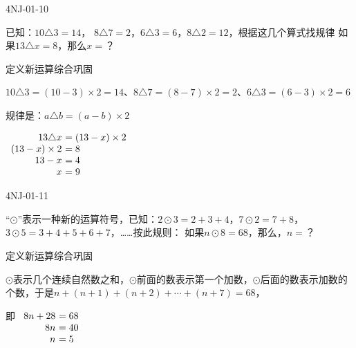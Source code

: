 \begin{defproblem}{4NJ-01-10}%
\begin{onlyproblem}%
已知：$10\triangle 3=14$， $8\triangle 7=2$，$6\triangle 3=6$，$8\triangle 2=12$，根据这几个算式找规律
如果$13\triangle x=8$，那么$x=$？



\end{onlyproblem}%
\begin{onlysolution}%
定义新运算综合巩固

$10\triangle 3=(10-3)\times 2=14$、$8\triangle 7=(8-7)\times 2=2$、$6\triangle 3=(6-3)\times 2=6$

规律是：$a\triangle b=(a-b)\times2$


$\begin{array}[t]{r@{~}l}
13\triangle x
&=(13-x)\times2\\
(13-x)\times2&=8\\
13-x&=4\\
x&=9\\
\end{array}
$
\end{onlysolution}%
\end{defproblem}





\begin{defproblem}{4NJ-01-11}%
\begin{onlyproblem}%
``$\odot$''表示一种新的运算符号，已知：$2\odot3=2+3+4$，$7\odot2=7+8$，
$3\odot 5=3+4+5+6+7$，……按此规则：
如果$n \odot 8=68$，那么，$n=$？


\end{onlyproblem}%
\begin{onlysolution}%
定义新运算综合巩固

$\odot$表示几个连续自然数之和，$\odot$前面的数表示第一个加数，$\odot$后面的数表示加数的个数，于是$n + (n + 1) + (n + 2) +  \cdots  + (n + 7) = 68$，

即
$\begin{array}[t]{r@{~}l}
8n+28&=68\\
8n&=40\\
n&=5\\
\end{array}
$
\end{onlysolution}%
\end{defproblem}





